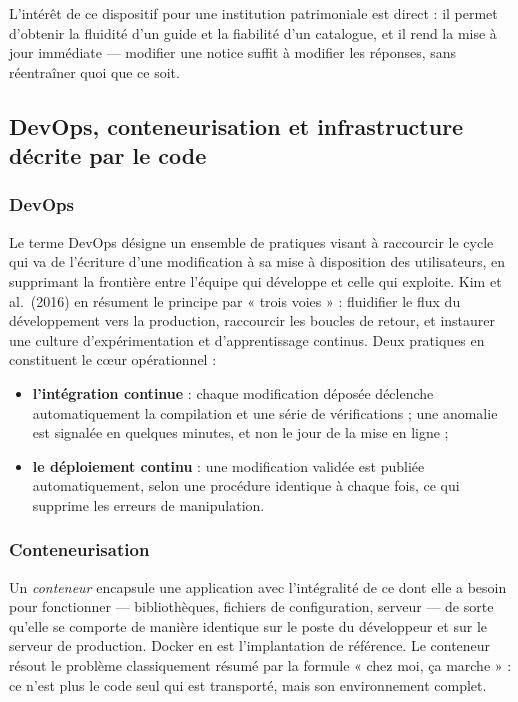 L'intérêt de ce dispositif pour une institution patrimoniale est direct : il
permet d'obtenir la fluidité d'un guide et la fiabilité d'un catalogue, et il
rend la mise à jour immédiate — modifier une notice suffit à modifier les
réponses, sans réentraîner quoi que ce soit.

\subsection{DevOps, conteneurisation et infrastructure décrite par le code}

\subsubsection{DevOps}

Le terme DevOps désigne un ensemble de pratiques visant à raccourcir le cycle
qui va de l'écriture d'une modification à sa mise à disposition des
utilisateurs, en supprimant la frontière entre l'équipe qui développe et celle
qui exploite. Kim et al.\ (2016) en résument le principe par « trois voies » :
fluidifier le flux du développement vers la production, raccourcir les boucles
de retour, et instaurer une culture d'expérimentation et d'apprentissage
continus. Deux pratiques en constituent le cœur opérationnel :

\begin{itemize}
  \item \textbf{l'intégration continue} : chaque modification déposée déclenche
        automatiquement la compilation et une série de vérifications ; une
        anomalie est signalée en quelques minutes, et non le jour de la mise en
        ligne ;
  \item \textbf{le déploiement continu} : une modification validée est publiée
        automatiquement, selon une procédure identique à chaque fois, ce qui
        supprime les erreurs de manipulation.
\end{itemize}

\subsubsection{Conteneurisation}

Un \emph{conteneur} encapsule une application avec l'intégralité de ce dont elle
a besoin pour fonctionner — bibliothèques, fichiers de configuration, serveur —
de sorte qu'elle se comporte de manière identique sur le poste du développeur et
sur le serveur de production. Docker en est l'implantation de référence. Le
conteneur résout le problème classiquement résumé par la formule « chez moi, ça
marche » : ce n'est plus le code seul qui est transporté, mais son environnement
complet.

